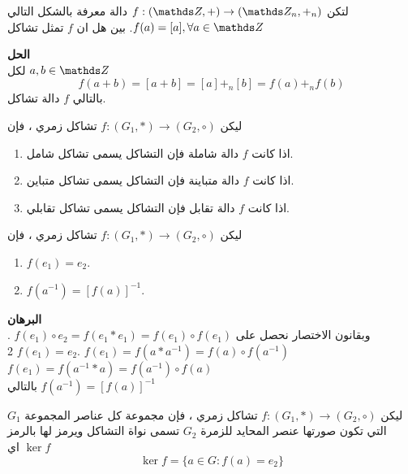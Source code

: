 \begin{example}
	لتكن 
	$f : (\Z, +) \to (\Z_n, +_n)$ دالة معرفة بالشكل التالي $f(a) = [a], \forall a\in \Z$. بين هل ان $f$ تمثل تشاكل
\end{example}
\noindent
\textbf{الحل}\\
\noindent
لكل $a, b\in \Z$
\[
f(a + b) = [a + b] = [a] +_n [b] = f(a) +_n f(b)
\]
بالتالي $f$ دالة تشاكل.

\begin{definition}
	ليكن 
	$f : (G_1, *) \to (G_2, \circ)$ تشاكل زمري ، فإن
	\begin{enumerate}
		\item اذا كانت $f$ دالة شاملة فإن التشاكل يسمى تشاكل شامل.
		\item اذا كانت $f$ دالة متباينة فإن التشاكل يسمى تشاكل متباين.
		\item اذا كانت $f$ دالة تقابل فإن التشاكل يسمى تشاكل تقابلي.
	\end{enumerate}
\end{definition}
\newpage
\begin{theorem}
	ليكن 	$f : (G_1, *) \to (G_2, \circ)$ تشاكل زمري ، فإن
	\begin{enumerate}[leftmargin=*]
		\item $f(e_1) = e_2$.
		\item  $f(a^{-1}) = [f(a)]^{-1}$.
	\end{enumerate}
\end{theorem}
\noindent
\textbf{البرهان}\\
. $f(e_1)  \circ e_2= f(e_1 * e_1) = f(e_1) \circ f(e_1)$ وبقانون الاختصار نحصل على $f(e_1) = e_2$
2. $f(e_1) = f(a * a^{-1}) = f(a) \circ f(a^{-1})$\\
\hspace*{9pt} $f(e_1) = f(a^{-1} * a) = f(a^{-1}) \circ f(a)$\\
\hspace*{9pt} بالتالي $f(a^{-1}) = [f(a)]^{-1}$

\begin{definition}
		ليكن 	$f : (G_1, *) \to (G_2, \circ)$ تشاكل زمري ، فإن مجموعة كل عناصر المجموعة $G_1$ التي تكون صورتها عنصر المحايد للزمرة $G_2$ تسمى نواة التشاكل ويرمز لها بالرمز $\ker f$ اي
		\[
		\ker f = \{a\in G : f(a) = e_2\}
		\]
\end{definition}

